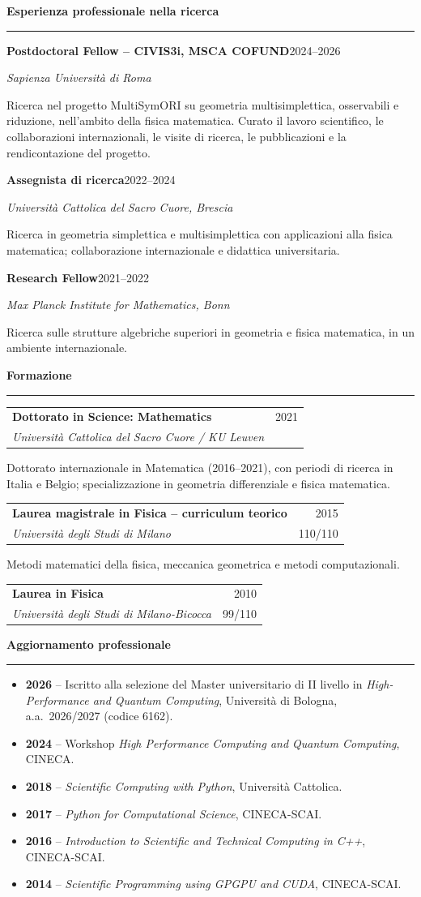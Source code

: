 \documentclass[10pt,a4paper]{article}
\makeatletter
\newcommand{\cvsection}[1]{%
    \Needspace{4\baselineskip}%
    \vspace{0.8em}%
    {\large\bfseries\color{accent} #1}\par
    \vspace{0.2em}\hrule\vspace{0.45em}%
}
\newcommand{\entry}[4]{%
    \Needspace{4\baselineskip}%
    \textbf{#1}\hfill #2\par
    \textit{#3}\par
    #4\par\vspace{0.45em}%
}
\newcommand{\education}[5]{%
    \Needspace{5\baselineskip}%
    \begin{tabularx}{\textwidth}{@{}>{\raggedright\arraybackslash}Xr@{}}
        \textbf{#1} & #2 \\
        \textit{#4} & #3
    \end{tabularx}\par
    #5\par\vspace{0.45em}%
}
\makeatother
\begin{document}
\newpage
\cvsection{Esperienza professionale nella ricerca}
\entry{Postdoctoral Fellow -- CIVIS3i, MSCA COFUND}{2024--2026}{Sapienza Università di Roma}{%
Ricerca nel progetto MultiSymORI su geometria multisimplettica, osservabili e riduzione, nell'ambito della fisica matematica.
Curato il lavoro scientifico, le collaborazioni internazionali, le visite di ricerca, le pubblicazioni e la rendicontazione del progetto.
}
\entry{Assegnista di ricerca}{2022--2024}{Università Cattolica del Sacro Cuore, Brescia}{%
Ricerca in geometria simplettica e multisimplettica con applicazioni alla fisica matematica; collaborazione internazionale e didattica universitaria.}
\entry{Research Fellow}{2021--2022}{Max Planck Institute for Mathematics, Bonn}{%
Ricerca sulle strutture algebriche superiori in geometria e fisica matematica, in un ambiente internazionale.}

\cvsection{Formazione}
\education{Dottorato in Science: Mathematics}{2021}{}{Università Cattolica del Sacro Cuore / KU Leuven}{%
Dottorato internazionale in Matematica (2016--2021), con periodi di ricerca in Italia e Belgio; specializzazione in geometria differenziale e fisica matematica.}
\education{Laurea magistrale in Fisica -- curriculum teorico}{2015}{110/110}{Università degli Studi di Milano}{%
Metodi matematici della fisica, meccanica geometrica e metodi computazionali.}
\education{Laurea in Fisica}{2010}{99/110}{Università degli Studi di Milano-Bicocca}{}

\cvsection{Aggiornamento professionale}
\begin{itemize}
    \item \textbf{2026} -- Iscritto alla selezione del Master universitario di II livello in \emph{High-Performance and Quantum Computing}, Università di Bologna, a.a.\ 2026/2027 (codice 6162).
    \item \textbf{2024} -- Workshop \emph{High Performance Computing and Quantum Computing}, CINECA.
    \item \textbf{2018} -- \emph{Scientific Computing with Python}, Università Cattolica.
    \item \textbf{2017} -- \emph{Python for Computational Science}, CINECA-SCAI.
    \item \textbf{2016} -- \emph{Introduction to Scientific and Technical Computing in C++}, CINECA-SCAI.
    \item \textbf{2014} -- \emph{Scientific Programming using GPGPU and CUDA}, CINECA-SCAI.
\end{itemize}
\end{document}
